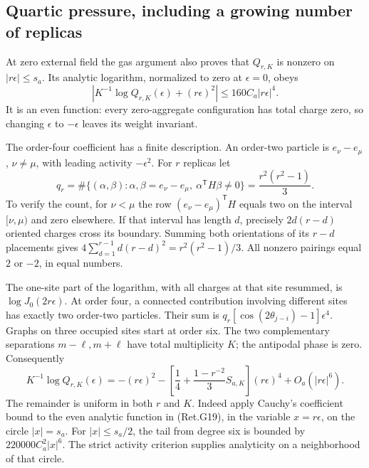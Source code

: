 \hypertarget{quartic-pressure-including-a-growing-number-of-replicas}{%
\subsection{Quartic pressure, including a growing number of replicas}\label{quartic-pressure-including-a-growing-number-of-replicas}}

At zero external field the gas argument also proves that \(Q_{r,K}\)
is nonzero on \(|r\epsilon|\le s_a\). Its analytic logarithm, normalized
to zero at \(\epsilon=0\), obeys
\[
 \left|K^{-1}\log Q_{r,K}(\epsilon)+(r\epsilon)^2\right|
                           \le160C_a|r\epsilon|^4.          \tag{Ret.G19}
\]
It is an even function: every zero-aggregate configuration has total
charge zero, so changing \(\epsilon\) to \(-\epsilon\) leaves its weight invariant.

The order-four coefficient has a finite description.
An order-two particle is \(e_\nu-e_\mu\), \(\nu\ne\mu\), with leading
activity \(-\epsilon^2\). For \(r\) replicas let
\[
 q_r=\#\{(\alpha,\beta):\alpha,\beta=e_\nu-e_\mu,\
                                  \alpha^{\mathsf T}H\beta\ne0\}
                         =\frac{r^2(r^2-1)}3.              \tag{Ret.G20}
\]
To verify the count, for \(\nu<\mu\) the row
\((e_\nu-e_\mu)^{\mathsf T}H\) equals two on the interval
\([\nu,\mu)\) and zero elsewhere.
If that interval has length \(d\), precisely \(2d(r-d)\) oriented
charges cross its boundary. Summing both orientations of its
\(r-d\) placements gives
\(4\sum_{d=1}^{r-1}d(r-d)^2=r^2(r^2-1)/3\).
All nonzero pairings equal \(2\) or \(-2\), in equal numbers.

The one-site part of the logarithm, with all charges at that site resummed,
is \(\log J_0(2r\epsilon)\).
At order four, a connected contribution involving different sites has
exactly two order-two particles. Their sum is
\(q_r[\cos(2\theta_{j-i})-1]\epsilon^4\).
Graphs on three occupied sites start at order six.
The two complementary separations \(m-\ell,m+\ell\) have total
multiplicity \(K\); the antipodal phase is zero.
Consequently
\[
 K^{-1}\log Q_{r,K}(\epsilon)
 =-(r\epsilon)^2
   -\left[\frac14+\frac{1-r^{-2}}3 S_{a,K}\right](r\epsilon)^4
                              +O_a(|r\epsilon|^6).         \tag{Ret.G21}
\]
The remainder is uniform in both \(r\) and \(K\).
Indeed apply Cauchy's coefficient bound to the even analytic function
in (Ret.G19), in the variable \(x=r\epsilon\), on the circle \(|x|=s_a\).
For \(|x|\le s_a/2\), the tail from degree six is bounded by
\(220000C_a^2|x|^6\). The strict activity criterion supplies analyticity
on a neighborhood of that circle.


